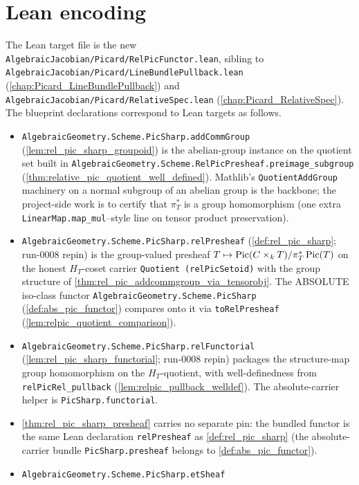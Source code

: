 \section{Lean encoding}
\label{sec:relpic_lean_encoding}

The Lean target file is the new
\texttt{AlgebraicJacobian/Picard/RelPicFunctor.lean}, sibling to
\texttt{AlgebraicJacobian/Picard/LineBundlePullback.lean}
(\cref{chap:Picard_LineBundlePullback}) and
\texttt{AlgebraicJacobian/Picard/RelativeSpec.lean}
(\cref{chap:Picard_RelativeSpec}). The blueprint declarations correspond to
Lean targets as follows.
\begin{itemize}
  \item \texttt{AlgebraicGeometry.Scheme.PicSharp.addCommGroup}
    (\cref{lem:rel_pic_sharp_groupoid}) is the abelian-group instance on the
    quotient set built in
    \texttt{AlgebraicGeometry.Scheme.RelPicPresheaf.preimage\_subgroup}
    (\cref{thm:relative_pic_quotient_well_defined}). Mathlib's
    \texttt{QuotientAddGroup} machinery on a normal subgroup of an abelian
    group is the backbone; the project-side work is to certify that
    \(\pi_T^*\) is a group homomorphism (one extra
    \texttt{LinearMap.map\_mul}--style line on tensor product preservation).
  \item \texttt{AlgebraicGeometry.Scheme.PicSharp.relPresheaf}
    (\cref{def:rel_pic_sharp}; run-0008 repin) is the group-valued presheaf
    \(T \mapsto \operatorname{Pic}(C \times_k T)/\pi_T^*\operatorname{Pic}(T)\) on the honest
    \(H_T\)-coset carrier \texttt{Quotient (relPicSetoid)} with the group
    structure of \cref{thm:rel_pic_addcommgroup_via_tensorobj}. The
    ABSOLUTE iso-class functor \texttt{AlgebraicGeometry.Scheme.PicSharp}
    (\cref{def:abs_pic_functor}) compares onto it via
    \texttt{toRelPresheaf} (\cref{lem:relpic_quotient_comparison}).
  \item \texttt{AlgebraicGeometry.Scheme.PicSharp.relFunctorial}
    (\cref{lem:rel_pic_sharp_functorial}; run-0008 repin) packages the
    structure-map group homomorphism on the \(H_T\)-quotient, with
    well-definedness from \texttt{relPicRel\_pullback}
    (\cref{lem:relpic_pullback_welldef}). The absolute-carrier helper is
    \texttt{PicSharp.functorial}.
  \item \cref{thm:rel_pic_sharp_presheaf} carries no separate pin: the
    bundled functor is the same Lean declaration \texttt{relPresheaf} as
    \cref{def:rel_pic_sharp} (the absolute-carrier bundle
    \texttt{PicSharp.presheaf} belongs to \cref{def:abs_pic_functor}).
  \item \texttt{AlgebraicGeometry.Scheme.PicSharp.etSheaf}

\end{itemize}
